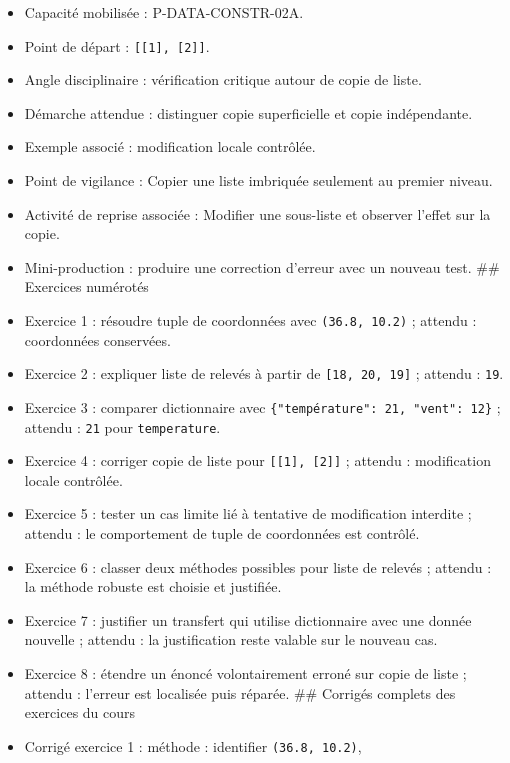 \begin{itemize}
  distincts. \#\# Objectif O4 - Contrôler un cas limite et corriger une
  erreur observée
\item
  Capacité mobilisée : P-DATA-CONSTR-02A.
\item
  Point de départ : \texttt{{[}{[}1{]},\ {[}2{]}{]}}.
\item
  Angle disciplinaire : vérification critique autour de copie de liste.
\item
  Démarche attendue : distinguer copie superficielle et copie
  indépendante.
\item
  Exemple associé : modification locale contrôlée.
\item
  Point de vigilance : Copier une liste imbriquée seulement au premier
  niveau.
\item
  Activité de reprise associée : Modifier une sous-liste et observer
  l'effet sur la copie.
\item
  Mini-production : produire une correction d'erreur avec un nouveau
  test. \#\# Exercices numérotés
\item
  Exercice 1 : résoudre tuple de coordonnées avec \texttt{(36.8,\ 10.2)}
  ; attendu : coordonnées conservées.
\item
  Exercice 2 : expliquer liste de relevés à partir de
  \texttt{{[}18,\ 20,\ 19{]}} ; attendu : \texttt{19}.
\item
  Exercice 3 : comparer dictionnaire avec
  \texttt{\{"température":\ 21,\ "vent":\ 12\}} ; attendu : \texttt{21}
  pour \texttt{temperature}.
\item
  Exercice 4 : corriger copie de liste pour
  \texttt{{[}{[}1{]},\ {[}2{]}{]}} ; attendu : modification locale
  contrôlée.
\item
  Exercice 5 : tester un cas limite lié à tentative de modification
  interdite ; attendu : le comportement de tuple de coordonnées est
  contrôlé.
\item
  Exercice 6 : classer deux méthodes possibles pour liste de relevés ;
  attendu : la méthode robuste est choisie et justifiée.
\item
  Exercice 7 : justifier un transfert qui utilise dictionnaire avec une
  donnée nouvelle ; attendu : la justification reste valable sur le
  nouveau cas.
\item
  Exercice 8 : étendre un énoncé volontairement erroné sur copie de
  liste ; attendu : l'erreur est localisée puis réparée. \#\# Corrigés
  complets des exercices du cours
\item
  Corrigé exercice 1 : méthode : identifier \texttt{(36.8,\ 10.2)},

\end{itemize}
